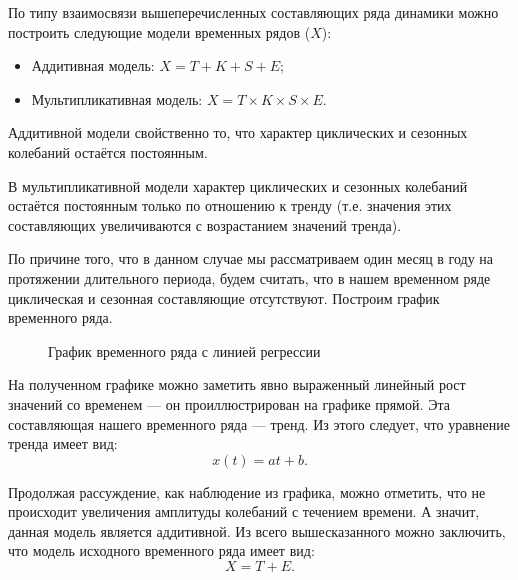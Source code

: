 По типу взаимосвязи вышеперечисленных составляющих ряда динамики можно построить следующие модели временных рядов ($X$):

\begin{itemize}
	\item Аддитивная модель: $X = T + K + S + E$;
	\item Мультипликативная модель: $X = T \times K \times S \times E$.
\end{itemize}
Аддитивной модели свойственно то, что характер циклических и сезонных колебаний остаётся постоянным.

В мультипликативной модели характер циклических и сезонных колебаний остаётся постоянным только по отношению к тренду (т.е. значения этих составляющих увеличиваются с возрастанием значений тренда).

По причине того, что в данном случае мы рассматриваем один месяц в году на протяжении длительного периода, будем считать, что в нашем временном ряде циклическая и сезонная составляющие отсутствуют. Построим график временного ряда.

\begin{figure}[ht]
\caption{График временного ряда с линией регрессии}
\label{img:ts_regr}
\end{figure}

На полученном графике можно заметить явно выраженный линейный рост значений со временем --- он проиллюстрирован на графике прямой. Эта составляющая нашего временного ряда --- тренд. Из этого следует, что уравнение тренда имеет вид:
\begin{equation*}
	x(t) = at + b.
\end{equation*}

Продолжая рассуждение, как наблюдение из графика, можно отметить, что не происходит увеличения амплитуды колебаний с течением времени. А значит, данная модель является аддитивной. Из всего вышесказанного можно заключить, что модель исходного временного ряда имеет вид:
\begin{equation*}
	X = T + E.
\end{equation*}

